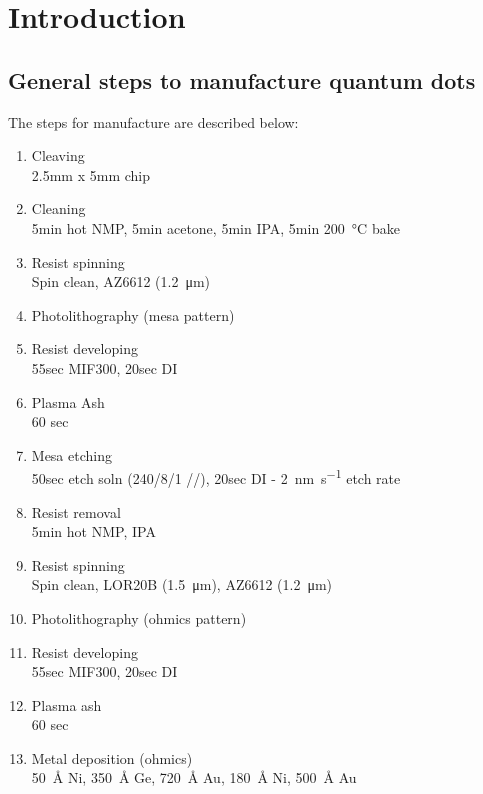 \section{Introduction}

\subsection{General steps to manufacture quantum dots}

The steps for manufacture are described below:\\

\begin{enumerate}[noitemsep]
\item Cleaving\\
    {\tiny 2.5mm x 5mm chip}
\item Cleaning\\
    {\tiny 5min hot NMP, 5min acetone, 5min IPA, 5min \SI{200}{\celsius} bake}
\item Resist spinning\\
    {\tiny Spin clean, AZ6612 (\SI{1.2}{\micro\meter})}
\item Photolithography (mesa pattern)
\item Resist developing\\
    {\tiny 55sec MIF300, 20sec DI }
\item Plasma Ash\\
    {\tiny 60 sec}
\item Mesa etching\\
    {\tiny 50sec etch soln (240/8/1 //), 20sec DI  - \SI{2}{\nano\meter\per\second} etch rate}
\item Resist removal\\
    {\tiny 5min hot NMP, IPA}
\item Resist spinning\\
    {\tiny Spin clean, LOR20B (\SI{1.5}{\micro\meter}), AZ6612 (\SI{1.2}{\micro\meter})}
\item Photolithography (ohmics pattern)
\item Resist developing\\
    {\tiny 55sec MIF300, 20sec DI }
\item Plasma ash\\
    {\tiny 60 sec}
\item Metal deposition (ohmics)\\
    {\tiny \SI{50}{\angstrom} Ni, \SI{350}{\angstrom} Ge, \SI{720}{\angstrom} Au, \SI{180}{\angstrom} Ni, \SI{500}{\angstrom} Au}

\end{enumerate}
